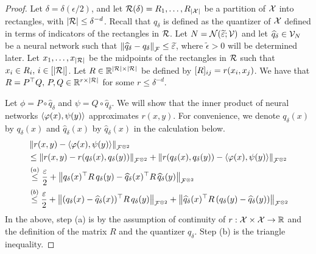 \begin{proof}
    Let $\delta = \delta(\epsilon / 2)$, and let ${\mathcal{R}}(\delta) = {R_1, \ldots, R_{\lvert{\mathcal{X}}\rvert}}$ be a partition of ${\mathcal{X}}$ into rectangles, with $\left\lvert{\mathcal{R}}\right\rvert \leq \delta^{-d}$. Recall that $q_\delta$ is defined as the quantizer of ${\mathcal{X}}$ defined in terms of indicators of the rectangles in ${\mathcal{R}}$. Let $N = {\mathcal{N}}(\widetilde{\varepsilon}; {\mathcal{V}})$ and let $\widehat{q}_\delta \in {\mathcal{V}}_N$ be a neural network such that $\left\lVert\widehat{q}_\delta - q_\delta\right\rVert_{\mathcal{F}} \leq \widetilde{\varepsilon}$, where $\tilde{\epsilon} > 0$ will be determined later. Let $x_1, \ldots, x_{\lvert{\mathcal{R}}\rvert}$ be the midpoints of the rectangles in ${\mathcal{R}}$ such that $x_i \in R_i,\, i \in [\lvert{\mathcal{R}}\rvert]$. Let $R \in \mathbb{R}^{\lvert{\mathcal{R}}\rvert \times \lvert{\mathcal{R}}\rvert}$ be defined by $[R]_{ij} = r(x_i, x_j)$. We have that $R = P^\top Q,\, P,Q \in \mathbb{R}^{r \times \lvert{\mathcal{R}}\rvert}$ for some $r \leq \delta^{-d}$.

    Let $\phi = P \circ \hat{q}_\delta$ and $\psi = Q \circ \hat{q}_{\delta}$. We will show that the inner product of neural networks $\left \langle \varphi(x), \psi(y) \right\rangle$ approximates $r(x, y)$. For convenience, we denote $q_\delta(x)$ by $q_\delta(x)$ and $\hat{q}_\delta(x)$ by $\hat{q}_\delta(x)$ in the calculation below.
    \begin{align*}
        &\norm{r(x,y) - \iprod{\phi(x)}{\psi(y)}}_{\calF^{\otimes 2}} \\
        &\leq \norm{r(x, y) - r(q_\delta(x), q_\delta(y))}_{\calF^{\otimes 2}} + \norm{r(q_\delta(x), q_\delta(y)) - \iprod{\phi(x)}{\psi(y)}}_{\calF^{\otimes 2}}\\
        &\stepa{\leq} \frac{\epsilon}{2} + \norm{q_{\delta}(x)^\top R\, q_{\delta}(y) - \hat{q}_{\delta}(x)^\top R\, \hat{q}_{\delta}(y)}_{\calF^{\otimes 2}}\\
        &\stepb{\leq} \frac{\epsilon}{2} + \norm{(q_\delta(x) - \hat{q}_\delta(x))^\top R\, q_\delta(y)}_{\calF^{\otimes 2}} + \norm{\hat{q}_\delta(x)^\top R\, (q_\delta(y) - \hat{q}_\delta(y))}_{\calF^{\otimes 2}}
    \end{align*}
    In the above, step (a) is by the assumption of continuity of $r: {\mathcal{X}} \times {\mathcal{X}} \to \mathbb{R}$ and the definition of the matrix $R$ and the quantizer $q_\delta$. Step (b) is the triangle inequality.


\end{proof}
